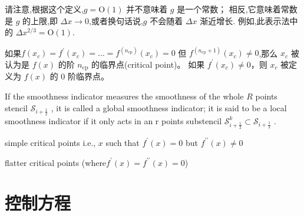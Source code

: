 \documentclass{book}
\begin{document}
\begin{example}
\begin{example}{}{}
\begin{example}
\begin{example}
\begin{example}
\begin{definition}
    请注意,根据这个定义,$g=\mathrm{O}(1)$ 并不意味着 $g$ 是一个常数； 相反,它意味着常数是 $g$ 的上限,即 $\Delta x \rightarrow 0$,或者换句话说,$g$ 不会随着 $\Delta x$ 渐近增长. 例如,此表示法中的 $\Delta x^{2 / 3}=\mathrm{O}(1)$.
\end{definition}
\begin{definition}
    如果$f\left(x_{c}\right)=f^{\prime}\left(x_{c}\right)=\ldots=f^{\left(n_{\mathrm{cp}}\right) }\left(x_{c}\right)=0$ 但 $f^{\left(n_{\mathrm{cp}}+1\right)}\left(x_{c}\right) \neq 0$,那么 $x_{c}$ 被认为是 $f(x)$ 的阶 $n_{\mathrm{cp}}$ 的临界点(critical point)。 如果 $f^{\prime}\left(x_{c}\right) \neq 0$，则 $x_{c}$ 被定义为 $f(x)$ 的 0 阶临界点。
\end{definition}
\begin{definition}
    \cite{WENO-Z-2016}
    If the smoothness indicator measures the smoothness of the whole  $R$  points stencil  $\mathcal{S}_{i+\frac{1}{2}}$ , it is called a global smoothness indicator; it is said to be a local smoothness indicator if it only acts in an  r  points substencil  $\mathcal{S}_{i+\frac{1}{2}}^{k} \subset \mathcal{S}_{i+\frac{1}{2}}$ .
\end{definition}
\begin{definition}
    \cite{WENO-Z-2016}
    simple critical points i.e.,  $x$  such that  $f^{\prime}(x)=0$  but  $f^{\prime \prime}(x) \neq 0$
\end{definition}
\begin{definition}
    \cite{WENO-Z-2016}
    flatter critical points (where$f^{\prime}(x)=f^{\prime \prime}(x)=0$)
\end{definition}


\section{控制方程}

\end{example}
\end{example}
\end{example}
\end{example}
\end{example}
\end{document}
